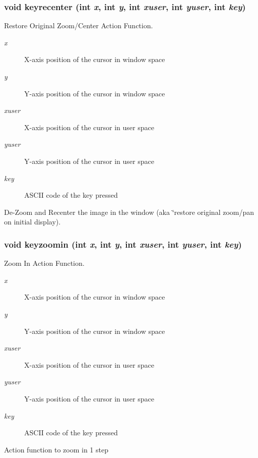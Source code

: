 \subsubsection{\setlength{\rightskip}{0pt plus 5cm}void keyrecenter (int {\em x}, int {\em y}, int {\em xuser}, int {\em yuser}, int {\em key})}\label{xtv_8h_a106}


Restore Original Zoom/Center Action Function. 

\begin{Desc}
\item[Parameters:]
\begin{description}
\item[{\em x}]X-axis position of the cursor in window space \item[{\em y}]Y-axis position of the cursor in window space \item[{\em xuser}]X-axis position of the cursor in user space \item[{\em yuser}]Y-axis position of the cursor in user space \item[{\em key}]ASCII code of the key pressed\end{description}
\end{Desc}
De-Zoom and Recenter the image in the window (aka \char`\"{}restore original zoom/pan on initial display). 
\subsubsection{\setlength{\rightskip}{0pt plus 5cm}void keyzoomin (int {\em x}, int {\em y}, int {\em xuser}, int {\em yuser}, int {\em key})}\label{xtv_8h_a103}


Zoom In Action Function. 

\begin{Desc}
\item[Parameters:]
\begin{description}
\item[{\em x}]X-axis position of the cursor in window space \item[{\em y}]Y-axis position of the cursor in window space \item[{\em xuser}]X-axis position of the cursor in user space \item[{\em yuser}]Y-axis position of the cursor in user space \item[{\em key}]ASCII code of the key pressed\end{description}
\end{Desc}
Action function to zoom in 1 step 
